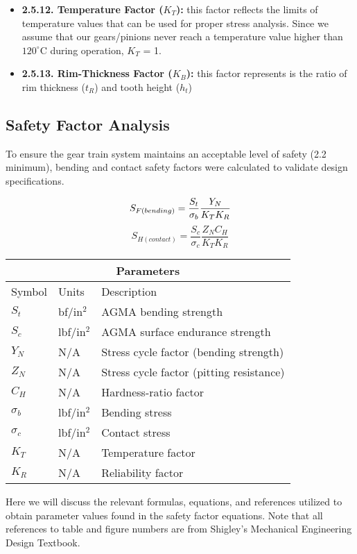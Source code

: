 \documentclass[letterpaper,12pt]{article}
\begin{document}
\begin{itemize}
    \item \textbf{2.5.12. Temperature Factor ($K_T$):} this factor reflects the limits of temperature values that can be used for proper stress analysis. Since we assume that our gears/pinions never reach a temperature value higher than $120^\circ$C during operation, $K_T$ = 1.
    
    \item \textbf{2.5.13. Rim-Thickness Factor ($K_B$):} this factor represents is the ratio of rim thickness ($t_R$) and tooth height ($h_t$) 

\end{itemize}

\subsection{Safety Factor Analysis}
To ensure the gear train system maintains an acceptable level of safety (2.2 minimum), bending and contact safety factors were calculated to validate design specifications.

\begin{equation}
S_{F(bending)} = \frac{S_t}{\sigma_b}\frac{Y_N}{K_T K_R} \\
\end{equation}
\begin{equation}
S_{H(contact)} = \frac{S_c}{\sigma_c}\frac{Z_N C_H}{K_T K_R}
\end{equation}

\begin{center}
	\begin{tabular}{ |p{2cm}||p{2cm}|p{7cm}|  }
		\hline
		\multicolumn{3}{|c|}{Parameters} \\
		\hline
		Symbol & Units & Description\\
		\hline
		$S_t$ & bf/in$^2$ & AGMA bending strength\\
		$S_c$ & lbf/in$^2$ & AGMA surface endurance strength\\
		$Y_N$ & N/A & Stress cycle factor (bending strength)\\
		$Z_N$ & N/A & Stress cycle factor (pitting resistance)\\
		$C_H$ & N/A & Hardness-ratio factor\\
		$\sigma_b$ & lbf/in$^2$ & Bending stress\\
		$\sigma_c$ & lbf/in$^2$ & Contact stress\\
		$K_T$ & N/A & Temperature factor\\
		$K_R$ & N/A & Reliability factor\\
		\hline
	\end{tabular}
\end{center}

\noindent Here we will discuss the relevant formulas, equations, and references utilized to obtain parameter values found in the safety factor equations. Note that all references to table and figure numbers are from Shigley's Mechanical Engineering Design Textbook.
\begin{equation}
    
\end{equation}
\end{document}
